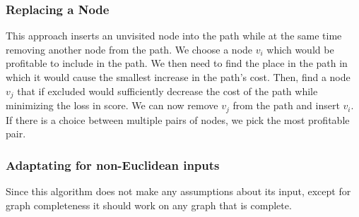\subsubsection{Replacing a Node}

This approach inserts an unvisited node into the path while at the same time removing another node from the path.
We choose a node $v_i$ which would be profitable to include in the path.
We then need to find the place in the path in which it would cause the smallest increase in the path's cost.
Then, find a node $v_j$ that if excluded would sufficiently decrease the cost of the path while minimizing the loss in score.
We can now remove $v_j$ from the path and insert $v_i$.
If there is a choice between multiple pairs of nodes, we pick the most profitable pair.

\subsubsection{Adaptating for non-Euclidean inputs}

Since this algorithm does not make any assumptions about its input, except for graph completeness it should work on any graph that is complete.
 